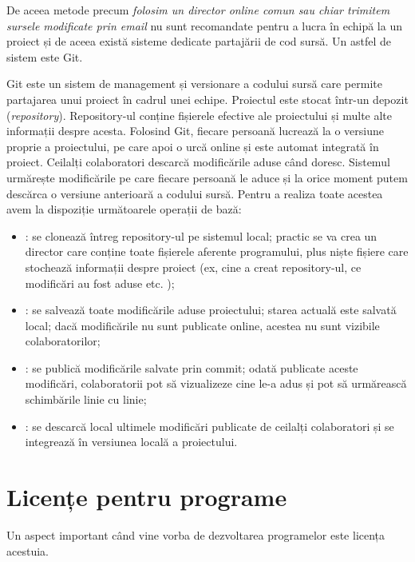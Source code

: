 De aceea metode precum \textit{folosim un director online comun sau chiar
trimitem sursele modificate prin email} nu sunt recomandate pentru a lucra în
echipă la un proiect și de aceea există sisteme dedicate partajării de cod
sursă. Un astfel de sistem este Git.

Git este un sistem de management și versionare a codului sursă care permite
partajarea unui proiect în cadrul unei echipe. Proiectul este stocat într-un
depozit (\textit{repository}). Repository-ul conține fișierele efective ale proiectului și
multe alte informații despre acesta. Folosind Git, fiecare persoană lucrează la
o versiune proprie a proiectului, pe care apoi o urcă online și este automat
integrată în proiect. Ceilalți colaboratori descarcă modificările aduse când
doresc. Sistemul urmărește modificările pe care fiecare persoană le aduce și la
orice moment putem descărca o versiune anterioară a codului sursă. Pentru a
realiza toate acestea avem la dispoziție următoarele operații de bază:

\begin{itemize}
  \item {}: se clonează întreg repository-ul pe sistemul local;
                practic se va crea un director care conține toate fișierele
                aferente programului, plus niște fișiere care stochează
                informații despre proiect (ex, cine a creat repository-ul, ce
                modificări au fost aduse etc. );
  \item {}: se salvează toate modificările aduse proiectului; starea
                actuală este salvată local; dacă modificările nu sunt publicate
                online, acestea nu sunt vizibile colaboratorilor;
  \item {}: se publică modificările salvate prin commit; odată
                publicate aceste modificări, colaboratorii pot să vizualizeze
                cine le-a adus și pot să urmărească schimbările linie cu linie;
  \item {}: se descarcă local ultimele modificări publicate de ceilalți
                colaboratori și se integrează în versiunea locală a proiectului.
\end{itemize}

\section{Licențe pentru programe}
\label{sec:appdev:license}

Un aspect important când vine vorba de dezvoltarea programelor este
licența acestuia.

